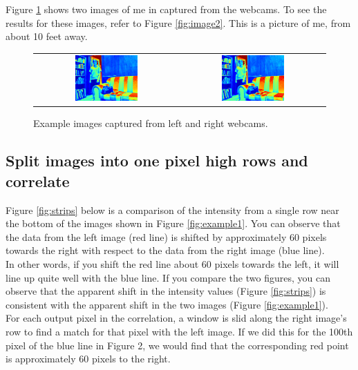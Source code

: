 \documentclass[11pt,fleqn]{article}
\begin{document}
Figure \ref{fig:image1} shows two images of me in captured from the webcams. To see the results for these images, refer to Figure \ref{fig:image2}.
This is a picture of me, from about 10 feet away.

\begin{figure}[!h]
\begin{mdframed}
\centering
\setlength{}
\begin{tabular}{cc}
\includegraphics[width=0.45\textwidth]{images/l.png} &
\includegraphics[width=0.45\textwidth]{images/r.png} \\[2pt]
\end{tabular}
\caption[Example images captured from webcams]{Example images captured from left and right webcams.}
\label{fig:image1}
\end{mdframed}
\end{figure}

\subsection{Split images into one pixel high rows and correlate}

Figure \ref{fig:strips} below is a comparison of the intensity from a single row near the bottom of the images shown in Figure \ref{fig:example1}. You can observe that the data from the left image (red line) is shifted by approximately 60 pixels towards the right with respect to the data from the right image (blue line).\\[5pt]
%
In other words, if you shift the red line about 60 pixels towards the left, it will line up quite well with the blue line. If you compare the two figures, you can observe that the apparent shift in the intensity values (Figure \ref{fig:strips}) is consistent with the apparent shift in the two images (Figure \ref{fig:example1}). \\[5pt]
%
For each output pixel in the correlation, a window is slid along the right image's row to find a match for that pixel with the left image. If we did this for the 100th pixel of the blue line in Figure 2, we would find that the corresponding red point is approximately 60 pixels to the right.\\
\end{document}
